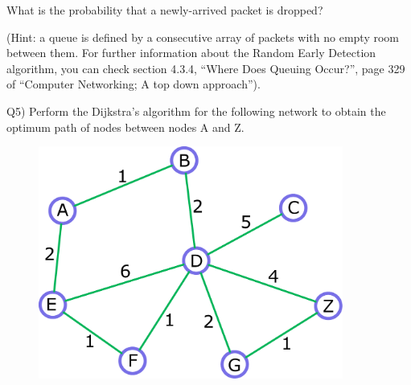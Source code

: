 \documentclass[10pt,letterpaper]{article}
\begin{document}
What is the probability that a newly-arrived packet is dropped?

(Hint: a queue is defined by a consecutive array of packets with no empty room between them. For further information about the Random Early Detection algorithm, you can check section 4.3.4, ``Where Does Queuing Occur?'', page 329 of ``Computer Networking; A top down approach'').

Q5) Perform the Dijkstra's algorithm for the following network to obtain the optimum path of nodes between nodes A and Z.
\begin{figure}[htbp]
\centering
\includegraphics[width=100mm]{dij.eps}
\end{figure}
\end{document}
